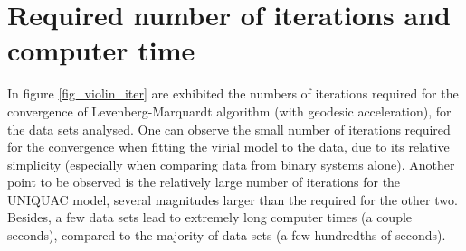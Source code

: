 \documentclass[
	12pt,				%
	openright,
	twoside,
	a4paper,			%
	brazil,			%
	french,				%
	english				%
	]{abntex2}
\begin{document}
\section{Required number of iterations and computer time}

In figure \ref{fig_violin_iter} are exhibited the numbers of iterations required
for the convergence of Levenberg-Marquardt algorithm (with geodesic acceleration),
for the data sets analysed. One can observe the small number of iterations required
for the convergence when fitting the virial model to the data, due to its relative
simplicity (especially when comparing data from binary systems alone). Another point
to be observed is the relatively large number of iterations for the UNIQUAC model,
several magnitudes larger than the required for the other two. Besides, a few data
sets lead to extremely long computer times (a couple seconds), compared to the
majority of data sets (a few hundredths of seconds).
\end{document}

